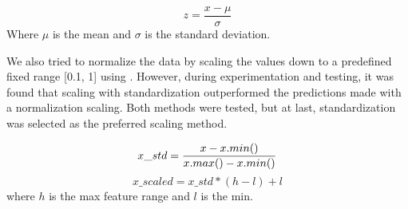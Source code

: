 \begin{equation}
  z = \frac{x - \mu}{\sigma}
  \label{eq:standardization}
\end{equation}
Where $\mu$ is the mean and $\sigma$ is the standard deviation.



We also tried to normalize the data by scaling the values down to a predefined fixed range
  [0.1, 1] using .
However, during experimentation and testing, it was found that scaling with standardization
outperformed the predictions made with a normalization scaling.
Both methods were tested, but at last, standardization was selected as the preferred scaling method.

\begin{equation}
  x\_std = \frac{x - x.min()}{x.max() - x.min()} \newline
  \label{eq:normalization}
\end{equation}
\begin{equation}
  x\_scaled = x\_std * (h - l) + l
  \label{eq:normalization2}
\end{equation}
where $h$ is the max feature range and $l$ is the min.

